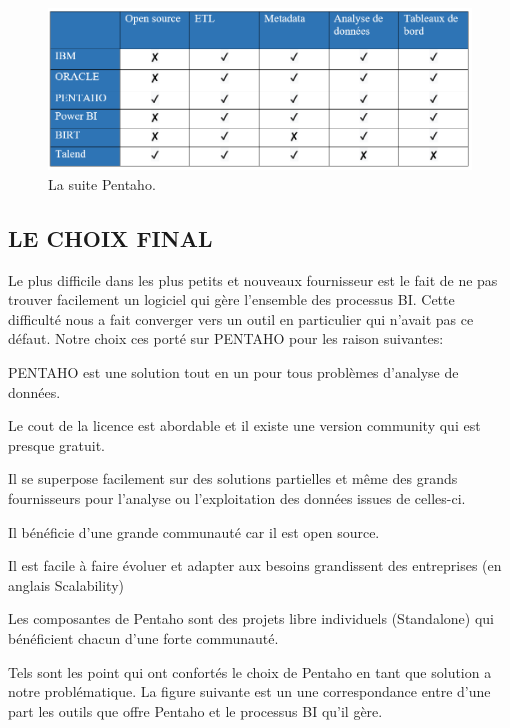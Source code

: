 	\begin{figure}[!htbp]
	\begin{center}
		\includegraphics[scale=0.55]{images/compare_bi_vendors_2.png}
		\caption{La suite Pentaho.}
		\label{bi_tools_compare}
	\end{center}
	\end{figure}
	
\subsection{LE CHOIX FINAL}

Le plus difficile dans les plus petits et nouveaux fournisseur est le fait de ne pas trouver facilement un logiciel qui gère l’ensemble des processus BI. Cette difficulté nous a fait converger vers un outil en particulier qui n’avait pas ce défaut. Notre choix ces porté sur PENTAHO pour les raison suivantes:
\begin{list}{•}{ }
   \item PENTAHO est une solution tout en un pour tous problèmes d’analyse de données.
   \item Le cout de la licence est abordable et il existe une version community qui est presque gratuit.
   \item Il se superpose facilement sur des solutions partielles et même des grands fournisseurs pour l’analyse ou l’exploitation des données issues de celles-ci.
   \item Il bénéficie d’une grande communauté car il est open source.
   \item Il est facile à faire évoluer et adapter aux besoins grandissent des entreprises (en anglais Scalability)
   \item Les composantes de Pentaho sont des projets libre individuels (Standalone) qui bénéficient chacun d’une forte communauté.\\
\end{list}

Tels sont les point qui ont confortés le choix de Pentaho en tant que solution a notre problématique. La figure suivante est un une correspondance entre d’une part les outils que offre Pentaho et le processus BI qu’il gère.

